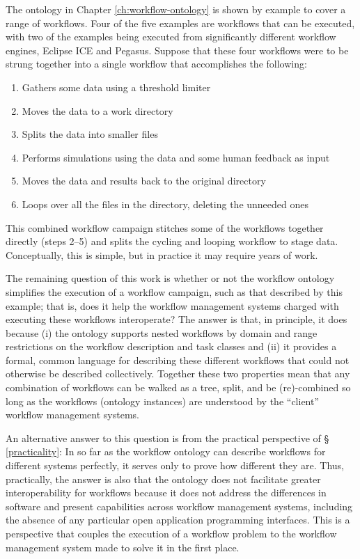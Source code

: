 The ontology in Chapter \ref{ch:workflow-ontology} is shown by example to cover
a range of workflows. Four of the five examples are workflows that can be
executed, with two of the examples being executed from significantly different
workflow engines, Eclipse ICE and Pegasus. Suppose that these four workflows
were to be strung together into a single workflow that accomplishes the
following:
\begin{enumerate}
  \item Gathers some data using a threshold limiter
  \item Moves the data to a work directory
  \item Splits the data into smaller files
  \item Performs simulations using the data and some human feedback as input
  \item Moves the data and results back to the original directory
  \item Loops over all the files in the directory, deleting the unneeded ones
\end{enumerate}
This combined workflow campaign stitches some of the workflows together directly
(steps 2--5) and splits the cycling and looping workflow to stage data.
Conceptually, this is simple, but in practice it may require years of work.

The remaining question of this work is whether or not the workflow ontology
simplifies the execution of a workflow campaign, such as that described by
this example; that is, does it help the workflow management systems charged with
executing these workflows interoperate? The answer is that, in principle, it
does because (i) the ontology supports nested workflows by domain and range
restrictions on the workflow description and task classes and (ii) it provides a
formal, common language for describing these different workflows that could not
otherwise be described collectively. Together these two properties mean that
any combination of workflows can be walked as a tree, split, and be
(re)-combined so long as the workflows (ontology instances) are understood by
the ``client'' workflow management systems.

An alternative answer to this question is from the practical perspective of \S
\ref{practicality}: In so far as the workflow ontology can describe workflows
for different systems perfectly, it serves only to prove how different they are.
Thus, practically, the answer is also that the ontology does not facilitate
greater interoperability for workflows because it does not address the
differences in software and present capabilities across workflow management
systems, including the absence of any particular open application programming
interfaces. This is a perspective that couples the execution of a workflow
problem to the workflow management system made to solve it in the first place.

